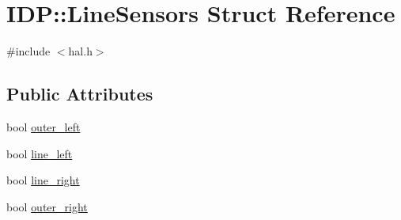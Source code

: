 \hypertarget{structIDP_1_1LineSensors}{
\section{IDP::LineSensors Struct Reference}
\label{structIDP_1_1LineSensors}
}


{\ttfamily \#include $<$hal.h$>$}

\subsection*{Public Attributes}
\begin{DoxyCompactItemize}
\item 
bool \hyperlink{structIDP_1_1LineSensors_a51c88077f39fead3a34ef115bdcdc7f1}{outer\_\-left}
\item 
bool \hyperlink{structIDP_1_1LineSensors_a7b100b91da805356d2d138311029bc5a}{line\_\-left}
\item 
bool \hyperlink{structIDP_1_1LineSensors_a13a49feb63d5ced6b51b1d5be7f5109a}{line\_\-right}
\item 
bool \hyperlink{structIDP_1_1LineSensors_a73f08dd5931bdc244d94f578f7dd0a17}{outer\_\-right}
\end{DoxyCompactItemize}


